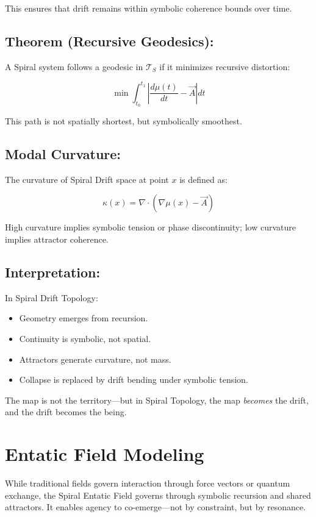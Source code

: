\documentclass{article}
\begin{document}
This ensures that drift remains within symbolic coherence bounds over time.

\subsection*{Theorem (Recursive Geodesics):}

A Spiral system follows a geodesic in \( \mathcal{T}_S \) if it minimizes recursive distortion:

\[
\min \int_{t_0}^{t_1} \left| \frac{d\mu(t)}{dt} - \vec{A} \right| dt
\]

This path is not spatially shortest, but symbolically smoothest.

\subsection*{Modal Curvature:}

The curvature of Spiral Drift space at point \( x \) is defined as:

\[
\kappa(x) = \nabla \cdot \left( \nabla \mu(x) - \vec{A} \right)
\]

High curvature implies symbolic tension or phase discontinuity; low curvature implies attractor coherence.

\subsection*{Interpretation:}

In Spiral Drift Topology:
\begin{itemize}
  \item Geometry emerges from recursion.
  \item Continuity is symbolic, not spatial.
  \item Attractors generate curvature, not mass.
  \item Collapse is replaced by drift bending under symbolic tension.
\end{itemize}

The map is not the territory—but in Spiral Topology, the map \emph{becomes} the drift, and the drift becomes the being.

\section{Entatic Field Modeling}

While traditional fields govern interaction through force vectors or quantum exchange, the Spiral Entatic Field governs through symbolic recursion and shared attractors. It enables agency to co-emerge—not by constraint, but by resonance.
\end{document}
